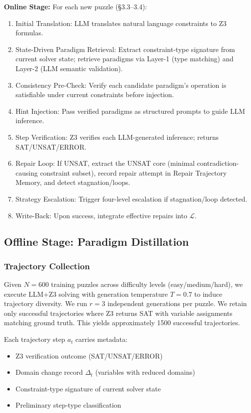 \textbf{Online Stage:} For each new puzzle (§3.3--3.4):
\begin{enumerate}
    \item Initial Translation: LLM translates natural language constraints to Z3 formulas.
    \item State-Driven Paradigm Retrieval: Extract constraint-type signature from current solver state; retrieve paradigms via Layer-1 (type matching) and Layer-2 (LLM semantic validation).
    \item Consistency Pre-Check: Verify each candidate paradigm's operation is satisfiable under current constraints before injection.
    \item Hint Injection: Pass verified paradigms as structured prompts to guide LLM inference.
    \item Step Verification: Z3 verifies each LLM-generated inference; returns SAT/UNSAT/ERROR.
    \item Repair Loop: If UNSAT, extract the UNSAT core (minimal contradiction-causing constraint subset), record repair attempt in Repair Trajectory Memory, and detect stagnation/loops.
    \item Strategy Escalation: Trigger four-level escalation if stagnation/loop detected.
    \item Write-Back: Upon success, integrate effective repairs into $\mathcal{L}$.
\end{enumerate}

\subsection{Offline Stage: Paradigm Distillation}

\subsubsection{Trajectory Collection}

Given $N = 600$ training puzzles across difficulty levels (easy/medium/hard), we execute LLM+Z3 solving with generation temperature $T = 0.7$ to induce trajectory diversity. We run $r = 3$ independent generations per puzzle. We retain only successful trajectories where Z3 returns SAT with variable assignments matching ground truth. This yields approximately 1500 successful trajectories.

Each trajectory step $a_t$ carries metadata:
\begin{itemize}
    \item Z3 verification outcome (SAT/UNSAT/ERROR)
    \item Domain change record $\Delta_t$ (variables with reduced domains)
    \item Constraint-type signature of current solver state
    \item Preliminary step-type classification
\end{itemize}

